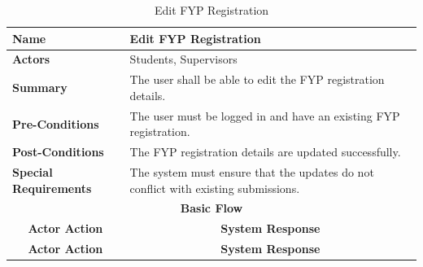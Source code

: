 \documentclass{FastFyp}
\begin{document}
\begin{longtable}{|lllll|}
\caption{Edit FYP Registration} \label{tab:edit-fyp-registration} \\ \hline
\multicolumn{2}{|l|}{\textbf{Name}} &
  \multicolumn{3}{l|}{Edit FYP Registration} \\ \hline
\multicolumn{2}{|l|}{\textbf{Actors}} &
  \multicolumn{3}{l|}{Students, Supervisors} \\ \hline
\multicolumn{2}{|l|}{\textbf{Summary}} &
  \multicolumn{3}{l|}{The user shall be able to edit the FYP registration details.} \\ \hline
\multicolumn{2}{|l|}{\textbf{Pre-Conditions}} &
  \multicolumn{3}{l|}{The user must be logged in and have an existing FYP registration.} \\ \hline
\multicolumn{2}{|l|}{\textbf{Post-Conditions}} &
  \multicolumn{3}{l|}{The FYP registration details are updated successfully.} \\ \hline
\multicolumn{2}{|l|}{\textbf{Special Requirements}} &
  \multicolumn{3}{l|}{The system must ensure that the updates do not conflict with existing submissions.} \\ \hline
\multicolumn{5}{|c|}{\textbf{Basic Flow}} \\ \hline
\multicolumn{3}{|c|}{\textbf{Actor Action}} &
  \multicolumn{2}{c|}{\textbf{System Response}} \\ \hline
\endfirsthead

\hline
\multicolumn{3}{|c|}{\textbf{Actor Action}} &
  \multicolumn{2}{c|}{\textbf{System Response}} \\ \hline
\endhead


\end{longtable}
\end{document}
